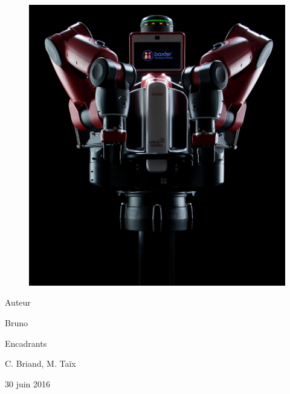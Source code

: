 \documentclass[a4paper,french, titlepage]{article}
\begin{document}
\begin{center}
\begin{figure}[H] 
\begin{center}
\includegraphics[scale=0.2]{Images/baxter.png}
\end{center}
\end{figure}

\vspace{0.5cm}

{\LARGE Auteur}\\

\vspace{0.2cm}

Bruno \\

\vspace{0.5cm}

{\Large Encadrants}\\

\vspace{0.2cm}

C. Briand, M. Taïx\\ 



\vspace{1cm}


30 juin 2016




\end{center}
\end{document}
